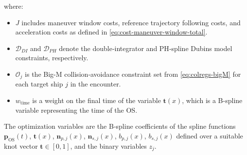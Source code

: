 where:
\begin{itemize}
    \item $J$ includes maneuver window costs, reference trajectory following costs, and acceleration costs as defined in \cref{eq:cost-maneuver-window-total}.
    \item $\mathcal{D}_{DI}$ and $\mathcal{D}_{PH}$ denote the double‐integrator and PH‐spline Dubins model constraints, respectively.
    \item $\mathcal{O}_j$ is the Big-M collision‐avoidance constraint set from \eqref{eq:colregs-bigM} for each target ship $j$ in the encounter.
    \item $w_\text{time}$ is a weight on the final time of the variable $\mathbf t(x)$, which is a B-spline variable representing the time of the OS.
\end{itemize}

The optimization variables are the B-spline coefficients of the spline functions
$\mathbf{p}_\text{OS}(t)$, $\mathbf t(x)$, $\mathbf{n}_{p,j}(x)$, $\mathbf{n}_{s,j}(x)$, $b_{p,j}(x)$, $b_{s,j}(x)$ defined over a suitable knot vector $\mathbf{t}\in[0,1]$, and the binary variables $z_j$.

